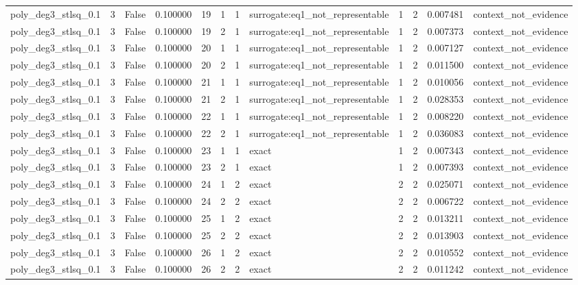 \begin{tabular}{lrrrrrrlrrrl}
poly\_deg3\_stlsq\_0.1 & 3 & False & 0.100000 & 19 & 1 & 1 & surrogate:eq1\_not\_representable & 1 & 2 & 0.007481 & context\_not\_evidence \\
poly\_deg3\_stlsq\_0.1 & 3 & False & 0.100000 & 19 & 2 & 1 & surrogate:eq1\_not\_representable & 1 & 2 & 0.007373 & context\_not\_evidence \\
poly\_deg3\_stlsq\_0.1 & 3 & False & 0.100000 & 20 & 1 & 1 & surrogate:eq1\_not\_representable & 1 & 2 & 0.007127 & context\_not\_evidence \\
poly\_deg3\_stlsq\_0.1 & 3 & False & 0.100000 & 20 & 2 & 1 & surrogate:eq1\_not\_representable & 1 & 2 & 0.011500 & context\_not\_evidence \\
poly\_deg3\_stlsq\_0.1 & 3 & False & 0.100000 & 21 & 1 & 1 & surrogate:eq1\_not\_representable & 1 & 2 & 0.010056 & context\_not\_evidence \\
poly\_deg3\_stlsq\_0.1 & 3 & False & 0.100000 & 21 & 2 & 1 & surrogate:eq1\_not\_representable & 1 & 2 & 0.028353 & context\_not\_evidence \\
poly\_deg3\_stlsq\_0.1 & 3 & False & 0.100000 & 22 & 1 & 1 & surrogate:eq1\_not\_representable & 1 & 2 & 0.008220 & context\_not\_evidence \\
poly\_deg3\_stlsq\_0.1 & 3 & False & 0.100000 & 22 & 2 & 1 & surrogate:eq1\_not\_representable & 1 & 2 & 0.036083 & context\_not\_evidence \\
poly\_deg3\_stlsq\_0.1 & 3 & False & 0.100000 & 23 & 1 & 1 & exact & 1 & 2 & 0.007343 & context\_not\_evidence \\
poly\_deg3\_stlsq\_0.1 & 3 & False & 0.100000 & 23 & 2 & 1 & exact & 1 & 2 & 0.007393 & context\_not\_evidence \\
poly\_deg3\_stlsq\_0.1 & 3 & False & 0.100000 & 24 & 1 & 2 & exact & 2 & 2 & 0.025071 & context\_not\_evidence \\
poly\_deg3\_stlsq\_0.1 & 3 & False & 0.100000 & 24 & 2 & 2 & exact & 2 & 2 & 0.006722 & context\_not\_evidence \\
poly\_deg3\_stlsq\_0.1 & 3 & False & 0.100000 & 25 & 1 & 2 & exact & 2 & 2 & 0.013211 & context\_not\_evidence \\
poly\_deg3\_stlsq\_0.1 & 3 & False & 0.100000 & 25 & 2 & 2 & exact & 2 & 2 & 0.013903 & context\_not\_evidence \\
poly\_deg3\_stlsq\_0.1 & 3 & False & 0.100000 & 26 & 1 & 2 & exact & 2 & 2 & 0.010552 & context\_not\_evidence \\
poly\_deg3\_stlsq\_0.1 & 3 & False & 0.100000 & 26 & 2 & 2 & exact & 2 & 2 & 0.011242 & context\_not\_evidence \\

\end{tabular}
